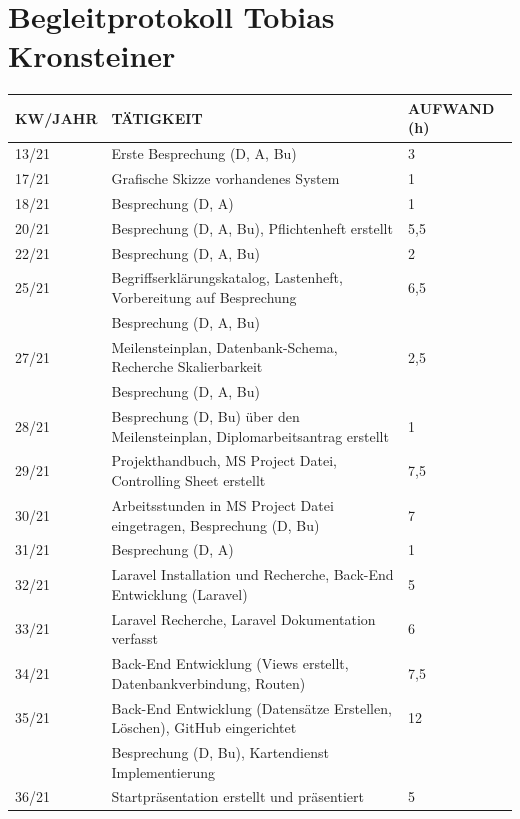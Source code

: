 \newpage
\section{Begleitprotokoll Tobias Kronsteiner}
\begin{table}[h]
	\begin{tabular}{|l|l|l|}
		\hline
		\textbf{KW/JAHR} &     \textbf{TÄTIGKEIT}  & 	\textbf{AUFWAND (h)}    \\ \hline
		
		13/21   & Erste Besprechung (D, A, Bu) & 3 	\\ \hline
		17/21   & Grafische Skizze vorhandenes System  & 1 	\\ \hline
		18/21   & Besprechung (D, A)  & 1 	\\ \hline
		20/21   & Besprechung (D, A, Bu), Pflichtenheft erstellt & 5,5 	\\ \hline
		22/21   & Besprechung (D, A, Bu) & 2	\\ \hline
		25/21   & Begriffserklärungskatalog, Lastenheft, Vorbereitung auf Besprechung & 6,5   \\
		& Besprechung (D, A, Bu) & \\ \hline	
		27/21   & Meilensteinplan, Datenbank-Schema, Recherche Skalierbarkeit  & 2,5 \\
		& Besprechung (D, A, Bu) & 	\\ \hline		
		28/21   & Besprechung (D, Bu) über den Meilensteinplan, Diplomarbeitsantrag erstellt  & 1 \\ \hline		
		29/21   & Projekthandbuch, MS Project Datei, Controlling Sheet erstellt & 7,5	\\ \hline
		30/21   & Arbeitsstunden in MS Project Datei eingetragen, Besprechung (D, Bu) & 7 	\\ \hline
		31/21   & Besprechung (D, A)  & 1	\\ \hline
		32/21   & Laravel Installation und Recherche, Back-End Entwicklung (Laravel) & 5	\\ \hline
		33/21   & Laravel Recherche, Laravel Dokumentation verfasst & 6	\\ \hline
		34/21   & Back-End Entwicklung (Views erstellt, Datenbankverbindung, Routen) & 7,5	\\ \hline
		35/21   & Back-End Entwicklung (Datensätze Erstellen, Löschen), GitHub eingerichtet  & 12 \\ 
		& Besprechung (D, Bu), Kartendienst Implementierung  &	\\ \hline
		36/21   &Startpräsentation erstellt und präsentiert & 5 \\ 

\end{tabular}
\end{table}
